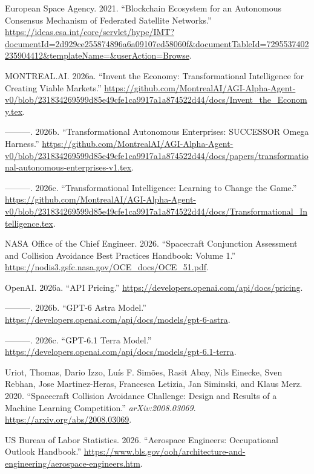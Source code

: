 \documentclass[11pt,letterpaper]{article}
\newenvironment{CSLReferences}[2]{\setlength{\parindent}{0pt}\setlength{\parskip}{0.6em}\small}{ }
\begin{document}
\hypertarget{refs}{}
\begin{CSLReferences}{1}{0}
\leavevmode{}%
European Space Agency. 2021. {``Blockchain Ecosystem for an Autonomous
Consensus Mechanism of Federated Satellite Networks.''}
\url{https://ideas.esa.int/core/servlet/hype/IMT?documentId=2d929ce255874896a6a09107ed58060f\&documentTableId=7295537402235904412\&templateName=\&userAction=Browse}.

\leavevmode{}%
MONTREAL.AI. 2026a. {``Invent the Economy: Transformational Intelligence
for Creating Viable Markets.''}
\url{https://github.com/MontrealAI/AGI-Alpha-Agent-v0/blob/231834269599d85e49cfe1ca9917a1a874522d44/docs/Invent_the_Economy.tex}.

\leavevmode{}%
---------. 2026b. {``Transformational Autonomous Enterprises: SUCCESSOR
Omega Harness.''}
\url{https://github.com/MontrealAI/AGI-Alpha-Agent-v0/blob/231834269599d85e49cfe1ca9917a1a874522d44/docs/papers/transformational-autonomous-enterprises-v1.tex}.

\leavevmode{}%
---------. 2026c. {``Transformational Intelligence: Learning to Change
the Game.''}
\url{https://github.com/MontrealAI/AGI-Alpha-Agent-v0/blob/231834269599d85e49cfe1ca9917a1a874522d44/docs/Transformational_Intelligence.tex}.

\leavevmode{}%
NASA Office of the Chief Engineer. 2026. {``Spacecraft Conjunction
Assessment and Collision Avoidance Best Practices Handbook: Volume 1.''}
\url{https://nodis3.gsfc.nasa.gov/OCE_docs/OCE_51.pdf}.

\leavevmode{}%
OpenAI. 2026a. {``API Pricing.''}
\url{https://developers.openai.com/api/docs/pricing}.

\leavevmode{}%
---------. 2026b. {``GPT-6 Astra Model.''}
\url{https://developers.openai.com/api/docs/models/gpt-6-astra}.

\leavevmode{}%
---------. 2026c. {``GPT-6.1 Terra Model.''}
\url{https://developers.openai.com/api/docs/models/gpt-6.1-terra}.

\leavevmode{}%
Uriot, Thomas, Dario Izzo, Luís F. Simões, Rasit Abay, Nils Einecke,
Sven Rebhan, Jose Martinez-Heras, Francesca Letizia, Jan Siminski, and
Klaus Merz. 2020. {``Spacecraft Collision Avoidance Challenge: Design
and Results of a Machine Learning Competition.''}
\emph{arXiv:2008.03069}. \url{https://arxiv.org/abs/2008.03069}.

\leavevmode{}%
US Bureau of Labor Statistics. 2026. {``Aerospace Engineers:
Occupational Outlook Handbook.''}
\url{https://www.bls.gov/ooh/architecture-and-engineering/aerospace-engineers.htm}.

\end{CSLReferences}
\end{document}

